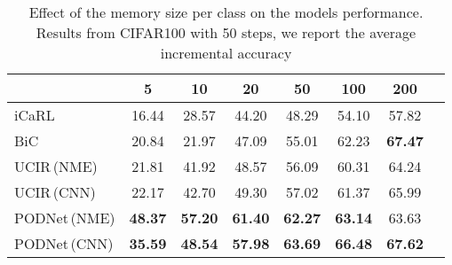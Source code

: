 \documentclass[runningheads]{llncs}
\begin{document}
\begin{table}[t]
\centering
\caption{Effect of the memory size per class  on the models performance. Results from CIFAR100 with 50 steps, we report the average incremental accuracy}
\label{tab:ablation_memorysize}
\begin{tabular}{@{}lccccccc@{}}
 \toprule
  & 5     & 10    & \textbf{20}    & 50    & 100   & 200\\
 \midrule
iCaRL \cite{rebuffi2017icarl}      & 16.44 & 28.57 & 44.20 & 48.29 & 54.10 & 57.82\\
BiC \cite{wu2019bias_correction}       & 20.84  & 21.97  & 47.09  & 55.01  & 62.23  & \textbf{67.47}\\
UCIR\,{\scriptsize (NME)} \cite{hou2019ucir} & 21.81 & 41.92 & 48.57 & 56.09 & 60.31 & 64.24\\
UCIR\,{\scriptsize (CNN)} \cite{hou2019ucir} & 22.17 & 42.70 & 49.30 & 57.02 & 61.37 & 65.99\\
PODNet\,{\scriptsize (NME)}& \textbf{48.37} & \textbf{57.20} & \textbf{61.40} & \textbf{62.27} & \textbf{63.14} & 63.63\\
PODNet\,{\scriptsize (CNN)} & \textbf{35.59} & \textbf{48.54} & \textbf{57.98} & \textbf{63.69} & \textbf{66.48} & \textbf{67.62} \\
\bottomrule
\end{tabular}
\end{table}
\end{document}
